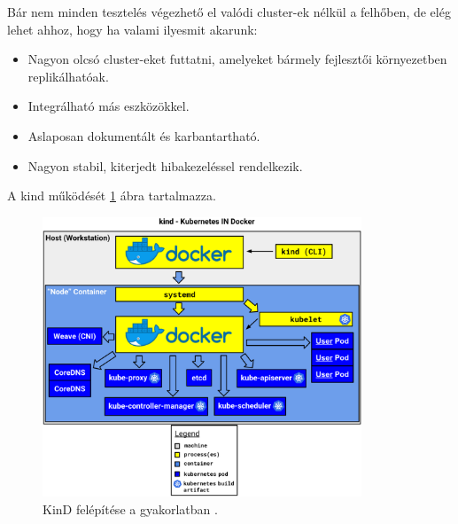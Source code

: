 Bár nem minden tesztelés végezhető el valódi cluster-ek nélkül a felhőben, de elég lehet ahhoz, hogy ha valami ilyesmit akarunk: \cite{KinD}
\begin{itemize}
    \item Nagyon olcsó cluster-eket futtatni, amelyeket bármely fejlesztői környezetben replikálhatóak.
    \item Integrálható más eszközökkel.
    \item Aslaposan dokumentált és karbantartható.
    \item Nagyon stabil, kiterjedt hibakezeléssel rendelkezik.
\end{itemize}

A kind működését \ref{kind-overview} ábra tartalmazza.

\begin{figure}[ht]
    \centering
         \includegraphics[width=0.85\textwidth]{figures/kubernetes/kind-overview-mod.png}
          \caption{KinD felépítése a gyakorlatban \cite{KinD}.}
           \label{kind-overview}
\end{figure}